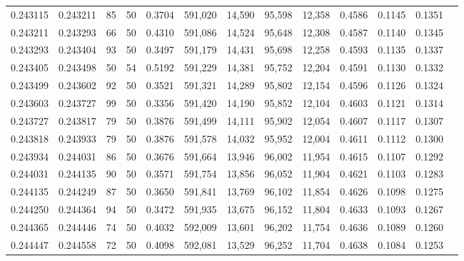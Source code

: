 \begin{tabular}{rrrrrrrrrrrrr}
0.243115 & 0.243211 &    85 &  50 &                                     0.3704 & 591,020 &  14,590 &  95,598 &  12,358 & 0.4586 & 0.1145 & 0.1351 \\
0.243211 & 0.243293 &    66 &  50 &                                     0.4310 & 591,086 &  14,524 &  95,648 &  12,308 & 0.4587 & 0.1140 & 0.1345 \\
0.243293 & 0.243404 &    93 &  50 &                                     0.3497 & 591,179 &  14,431 &  95,698 &  12,258 & 0.4593 & 0.1135 & 0.1337 \\
0.243405 & 0.243498 &    50 &  54 &                                     0.5192 & 591,229 &  14,381 &  95,752 &  12,204 & 0.4591 & 0.1130 & 0.1332 \\
0.243499 & 0.243602 &    92 &  50 &                                     0.3521 & 591,321 &  14,289 &  95,802 &  12,154 & 0.4596 & 0.1126 & 0.1324 \\
0.243603 & 0.243727 &    99 &  50 &                                     0.3356 & 591,420 &  14,190 &  95,852 &  12,104 & 0.4603 & 0.1121 & 0.1314 \\
0.243727 & 0.243817 &    79 &  50 &                                     0.3876 & 591,499 &  14,111 &  95,902 &  12,054 & 0.4607 & 0.1117 & 0.1307 \\
0.243818 & 0.243933 &    79 &  50 &                                     0.3876 & 591,578 &  14,032 &  95,952 &  12,004 & 0.4611 & 0.1112 & 0.1300 \\
0.243934 & 0.244031 &    86 &  50 &                                     0.3676 & 591,664 &  13,946 &  96,002 &  11,954 & 0.4615 & 0.1107 & 0.1292 \\
0.244031 & 0.244135 &    90 &  50 &                                     0.3571 & 591,754 &  13,856 &  96,052 &  11,904 & 0.4621 & 0.1103 & 0.1283 \\
0.244135 & 0.244249 &    87 &  50 &                                     0.3650 & 591,841 &  13,769 &  96,102 &  11,854 & 0.4626 & 0.1098 & 0.1275 \\
0.244250 & 0.244364 &    94 &  50 &                                     0.3472 & 591,935 &  13,675 &  96,152 &  11,804 & 0.4633 & 0.1093 & 0.1267 \\
0.244365 & 0.244446 &    74 &  50 &                                     0.4032 & 592,009 &  13,601 &  96,202 &  11,754 & 0.4636 & 0.1089 & 0.1260 \\
0.244447 & 0.244558 &    72 &  50 &                                     0.4098 & 592,081 &  13,529 &  96,252 &  11,704 & 0.4638 & 0.1084 & 0.1253 \\

\end{tabular}
